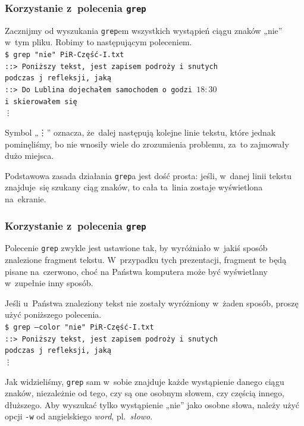 \documentclass[10pt,t]{beamer}
\begin{document}
\begin{frame}
  \frametitle{Korzystanie z~polecenia \texttt{grep}}


  Zacznijmy od wyszukania \texttt{grep}em wszystkich wystąpień ciągu znaków
  „nie” w~tym pliku. Robimy to następującym poleceniem. \\
  \texttt{\$ grep "nie"{} PiR-Część-I.txt} \\
  \texttt{::> Poniższy tekst, jest zapisem podroży i~snutych} \\
  \texttt{podczas j refleksji, jaką} \\
  \texttt{::> Do Lublina dojechałem samochodem o~godzi
    $18 \! : \! 30$} \\
  \texttt{i~skierowałem~się} \\
  \hspace{2em} \texttt{\vdots}

  Symbol „\vdots” oznacza, że~dalej następują kolejne linie tekstu, które
  jednak pominęliśmy, bo nie wnosiły wiele do zrozumienia problemu,
  za~to zajmowały dużo miejsca.

  Podstawowa zasada działania \texttt{grep}a jest dość prosta: jeśli,
  w~danej linii tekstu znajduje~się szukany ciąg znaków, to cała ta~linia
  zostaje wyświetlona na~ekranie.

\end{frame}





\begin{frame}
  \frametitle{Korzystanie z~polecenia \texttt{grep}}


  Polecenie \texttt{grep} zwykle jest ustawione tak, by wyróżniało
  w~jakiś sposób znalezione fragment tekstu. W~przypadku tych
  prezentacji, fragment te będą pisane na~czerwono, choć na Państwa
  komputera może być wyświetlany w~zupełnie inny sposób.

  Jeśli u~Państwa znaleziony tekst nie zostały wyróżniony w~żaden sposób,
  proszę użyć poniższego polecenia. \\
  \texttt{\$ grep --color "nie"{} PiR-Część-I.txt} \\
  \texttt{::> Poniższy tekst, jest zapisem podroży i~snutych} \\
  \texttt{podczas j refleksji, jaką} \\
  \hspace{2em} \texttt{\vdots}

  Jak widzieliśmy, \texttt{grep} sam w~sobie znajduje \alert{każde}
  wystąpienie danego ciągu znaków, niezależnie od tego, czy są one
  osobnym słowem, czy częścią innego, dłuższego. Aby wyszukać tylko
  wystąpienie „nie” jako osobne słowa, należy użyć opcji \texttt{-w}
  od angielskiego \textit{word}, pl.~\textit{słowo}.

\end{frame}
\end{document}

